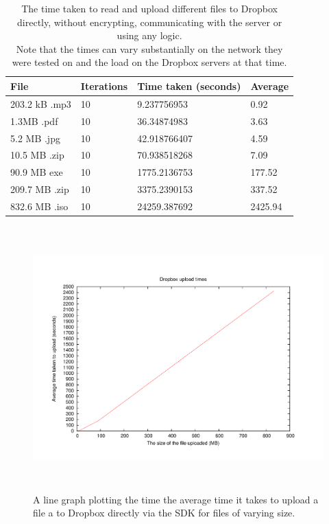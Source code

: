 \documentclass[12pt, titlepage]{article}
\begin{document}
\begin{table}[H]
\begin{center}
    \begin{tabular}{ | l | l | l | l |}
    \hline
    \textbf{File} & \textbf{Iterations} & \textbf{Time taken (seconds)} & \textbf{Average} \\ \hline
    203.2 kB .mp3 & 10 & 9.237756953 & 0.92 \\ \hline
    1.3MB .pdf & 10 & 36.34874983 & 3.63 \\ \hline
	5.2 MB .jpg & 10 & 42.918766407 & 4.59 \\ \hline
    10.5 MB .zip & 10 & 70.938518268 & 7.09 \\ \hline
    90.9 MB exe & 10 & 1775.2136753  & 177.52 \\ \hline
    209.7 MB .zip & 10 & 3375.2390153 & 337.52 \\ \hline
    832.6 MB .iso & 10 & 24259.387692 & 2425.94 \\ \hline
    \end{tabular}
    \caption{The time taken to read and upload different files to Dropbox directly, without encrypting, communicating with the server or using any logic. \\ Note that the times can vary substantially on the network they were tested on and the load on the Dropbox servers at that time.} \label{tab:uploadDropboxBenchmark}
    \end{center}
\end{table}


\begin{figure}[H]
\centerline{\includegraphics[height=4.0in,width=7in,angle=0]{plots/dropboxUpload/dropboxUploadTimes.pdf}}
\caption{A line graph plotting the time the average time it takes to upload a file a to Dropbox directly via the SDK for files of varying size.}
\label{fig:dropboxUploadLineGraph}
\end{figure}
\end{document}
